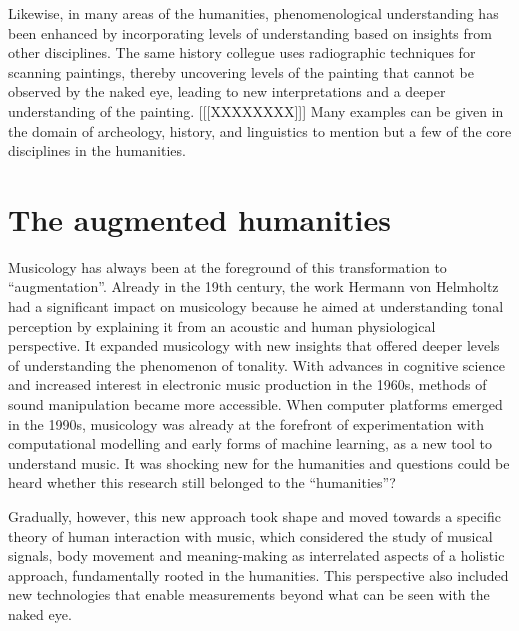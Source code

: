 \documentclass[
]{book}
\theoremstyle{definition}
\theoremstyle{definition}
\theoremstyle{definition}
\theoremstyle{definition}
\theoremstyle{remark}
\begin{document}
Likewise, in many areas of the humanities, phenomenological understanding has been enhanced by incorporating levels of understanding based on insights from other disciplines. The same history collegue uses radiographic techniques for scanning paintings, thereby uncovering levels of the painting that cannot be observed by the naked eye, leading to new interpretations and a deeper understanding of the painting.
{[}{[}{[}XXXXXXXX{]}{]}{]}
Many examples can be given in the domain of archeology, history, and linguistics to mention but a few of the core disciplines in the humanities.

\hypertarget{the-augmented-humanities}{%
\section{The augmented humanities}\label{the-augmented-humanities}}

Musicology has always been at the foreground of this transformation to ``augmentation''.
Already in the 19th century, the work Hermann von Helmholtz had a significant impact on musicology because he aimed at understanding tonal perception by explaining it from an acoustic and human physiological perspective. It expanded musicology with new insights that offered deeper levels of understanding the phenomenon of tonality.
With advances in cognitive science and increased interest in electronic music production in the 1960s, methods of sound manipulation became more accessible. When computer platforms emerged in the 1990s, musicology was already at the forefront of experimentation with computational modelling and early forms of machine learning, as a new tool to understand music.
It was shocking new for the humanities and questions could be heard whether this research still belonged to the ``humanities''?

Gradually, however, this new approach took shape and moved towards a specific theory of human interaction with music, which considered the study of musical signals, body movement and meaning-making as interrelated aspects of a holistic approach, fundamentally rooted in the humanities. This perspective also included new technologies that enable measurements beyond what can be seen with the naked eye.
\end{document}
